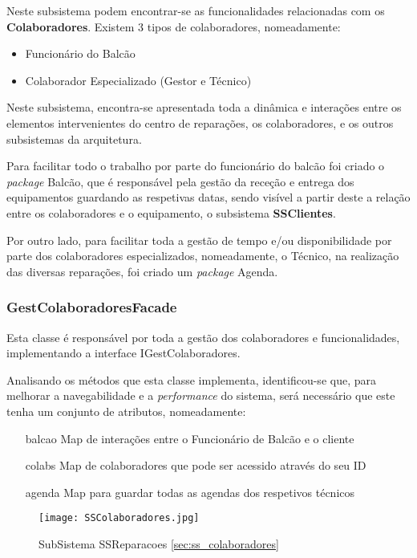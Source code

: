\documentclass[../../relatorio.tex]{subfiles}
\begin{document}
Neste subsistema podem encontrar-se as funcionalidades relacionadas com os \textbf{Colaboradores}.
Existem 3 tipos de colaboradores, nomeadamente:
\begin{itemize}
    \item Funcionário do Balcão
    \item Colaborador Especializado (Gestor e Técnico)
\end{itemize}

Neste subsistema, encontra-se apresentada toda a dinâmica e interações entre os elementos intervenientes do 
centro de reparações, os colaboradores, e os outros subsistemas da arquitetura.

Para facilitar todo o trabalho por parte do funcionário do balcão foi criado o \textit{package} Balcão, que é responsável pela gestão da
receção e entrega dos equipamentos guardando as respetivas datas, sendo visível a partir deste a relação entre os colaboradores e o equipamento,
o subsistema \textbf{SSClientes}.

Por outro lado, para facilitar toda a gestão de tempo e/ou disponibilidade por parte dos colaboradores especializados, nomeadamente, o Técnico, na realização das 
diversas reparações, foi criado um \textit{package} Agenda. 

\subsubsection{GestColaboradoresFacade}
Esta classe é responsável por toda a gestão dos colaboradores e funcionalidades, implementando a interface IGestColaboradores.

Analisando os métodos que esta classe implementa, identificou-se que, para melhorar a navegabilidade
e a \textit{performance} do sistema, será necessário que este tenha um conjunto de atributos, nomeadamente:
\begin{itemize}
    \item [balcao]{Map de interações entre o Funcionário de Balcão e o cliente}
    \item [colabs]{Map de colaboradores que pode ser acessido através do seu ID}
    \item [agenda]{Map para guardar todas as agendas dos respetivos técnicos}
\end{itemize}

\begin{figure}[!ht]
    \centering
    \texttt{[image: SSColaboradores.jpg]}
    \caption{SubSistema SSReparacoes \ref{sec:ss_colaboradores}}
\end{figure}
\end{document}
